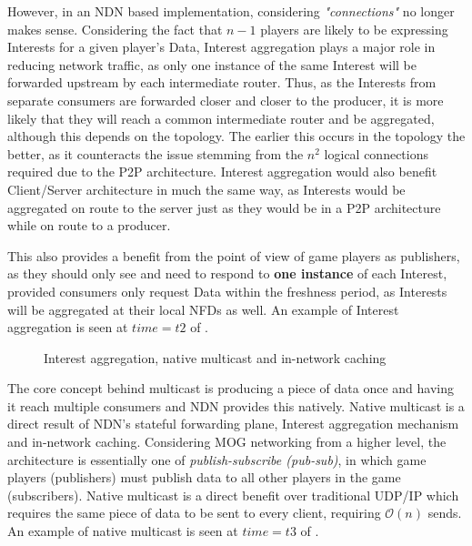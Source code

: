 However, in an NDN based implementation, considering \textit{"connections"} no longer makes sense. Considering the fact that $n-1$ players are likely to be expressing Interests for a given player's Data, Interest aggregation plays a major role in reducing network traffic, as only one instance of the same Interest will be forwarded upstream by each intermediate router. Thus, as the Interests from separate consumers are forwarded closer and closer to the producer, it is more likely that they will reach a common intermediate router and be aggregated, although this depends on the topology. The earlier this occurs in the topology the better, as it counteracts the issue stemming from the $n^2$ logical connections required due to the P2P architecture. Interest aggregation would also benefit Client/Server architecture in much the same way, as Interests would be aggregated on route to the server just as they would be in a P2P architecture while on route to a producer.

This also provides a benefit from the point of view of game players as publishers, as they should only see and need to respond to \textbf{one instance} of each Interest, provided consumers only request Data within the freshness period, as Interests will be aggregated at their local NFDs as well. An example of Interest aggregation is seen at $time = t2$ of .

\begin{figure}[H]
    \centering
    \caption{Interest aggregation, native multicast and in-network caching}
    \label{fig:agg-multicast}
\end{figure}


The core concept behind multicast is producing a piece of data once and having it reach multiple consumers and NDN provides this natively. Native multicast is a direct result of NDN's stateful forwarding plane, Interest aggregation mechanism and in-network caching. Considering MOG networking from a higher level, the architecture is essentially one of \textit{publish-subscribe (pub-sub)}, in which game players (publishers) must publish data to all other players in the game (subscribers). Native multicast is a direct benefit over traditional UDP/IP which requires the same piece of data to be sent to every client, requiring $\mathcal{O}(n)$ sends. An example of native multicast is seen at $time = t3$ of .


